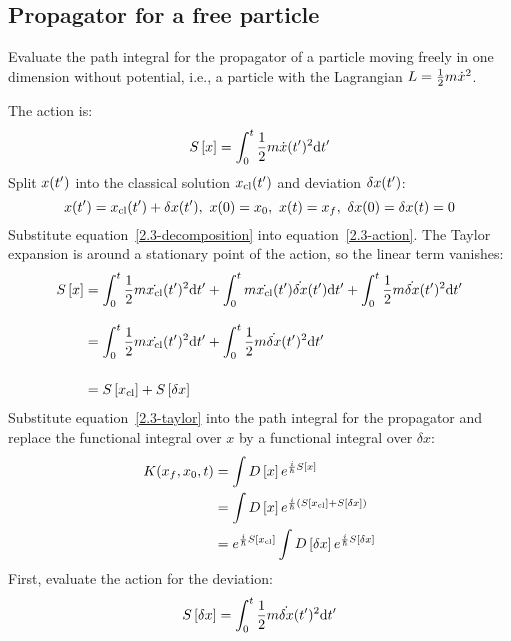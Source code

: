 \newcommand{\xcl}{x_{\text{cl}}}
\newcommand{\xd}{\delta{x}}
\newcommand{\dxd}[1]{\text{d}\xd_{#1}}

\subsection{Propagator for a free particle}

Evaluate the path integral for the propagator of a particle moving freely in
one dimension without potential, i.e., a particle with the Lagrangian $L =
  \frac{1}{2} m \dot{x}^2$.

The action is:
\begin{equation}
  \label{2.3-action}
  S\left[{x}\right] = \int_{0}^{t} \frac{1}{2} m \dot{x}(t^\prime)^2 \text{d}t^\prime
\end{equation}
Split $x(t^\prime)$ into the classical solution $\xcl(\tp)$ and deviation $\xd(\tp)$:
\begin{equation}
  \label{2.3-decomposition}
  x(\tp) = \xcl(\tp) + \xd(\tp),\
  x(0) = x_0,\
  x(t) = x_f,\
  \xd(0) = \xd(t) = 0
\end{equation}
Substitute equation~\ref{2.3-decomposition} into equation~\ref{2.3-action}.
The Taylor expansion is around a stationary point of the action, so the linear
term vanishes:
\begin{align}
  \label{2.3-taylor}
  \func{S}{x}
   & =
  \int_{0}^{t} \half m \dot{\xcl}(\tp)^2 \dtp +
  \int_{0}^{t} m \dot{\xcl}(\tp)\dot{\xd}(\tp) \dtp +
  \int_{0}^{t} \half m \dot{\xd}(\tp)^2 \dtp
  \nonumber
  \\[2ex]
   & =
  \int_{0}^{t} \half m \dot{\xcl}(\tp)^2 \dtp +
  \int_{0}^{t} \half m \dot{\xd}(\tp)^2 \dtp
  \nonumber
  \\[3ex]
   & =
  \func{S}{\xcl} + \func{S}{\xd}
\end{align}
Substitute equation~\ref{2.3-taylor} into the path integral for the propagator and
replace the functional integral over $x$ by a functional integral over $\xd$:
\begin{align}
  \propone
   & = \int \func{D}{x} e^{\frac{i}{\hbar} \func{S}{x}} \nonumber
  \\
   & = \int \func{D}{x} e^{\frac{i}{\hbar} (\func{S}{\xcl} + \func{S}{\xd})} \nonumber
  \\
  \label{2.3-propagator}
   & = e^{\frac{i}{\hbar} \func{S}{\xcl}} \int \func{D}{\xd} e^{\frac{i}{\hbar} \func{S}{\xd}}
\end{align}
First, evaluate the action for the deviation:
\begin{equation*}
  \func{S}{\xd} = \int_{0}^{t} \half m \dot{\xd}(\tp)^2 \dtp
\end{equation*}
